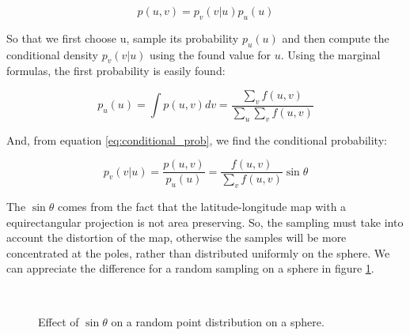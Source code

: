 $$
p(u,v) = p_v(v|u) p_u(u)
\label{eq:conditional_prob}
$$

So that we first choose u, sample its probability $p_u(u)$ and then compute the conditional density $p_v(v|u)$ using the found value for $u$. Using the marginal formulas, the first probability is easily found:

$$
p_u(u) =\int p(u,v) dv = \frac{ \displaystyle\sum_v f(u,v)}{ \displaystyle\sum_u \sum_v f(u,v)}
$$

And, from equation \ref{eq:conditional_prob}, we find the conditional probability:

$$
p_v(v|u) = \frac{p(u,v)}{p_u(u)} = \frac{f(u,v)}{ \displaystyle\sum_v f(u,v)} \sin \theta
$$

The $\sin \theta$ comes from the fact that the latitude-longitude map with a equirectangular projection is not area preserving. So, the sampling must take into account the distortion of the map, otherwise the samples will be more concentrated at the poles, rather than distributed uniformly on the sphere. We can appreciate the difference for a random sampling on a sphere in figure \ref{fig:randomsamplingsphere}.

\begin{figure}[!ht]
\centering
{}
 \\
\caption{Effect of $\sin\theta$ on a random point distribution on a sphere.}
\label{fig:randomsamplingsphere}
\end{figure}

